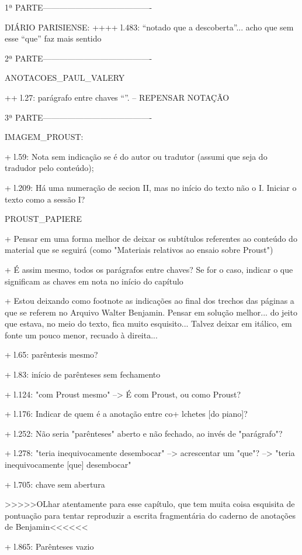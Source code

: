 1ª PARTE----------------------------------------

DIÁRIO PARISIENSE:
++++ l.483: ``notado que a descoberta''... acho que sem esse ``que'' faz mais sentido


2ª PARTE----------------------------------------


ANOTACOES_PAUL_VALERY

++ l.27: parágrafo entre chaves ``{}''. -- REPENSAR NOTAÇÃO

3ª PARTE----------------------------------------

IMAGEM_PROUST:

+ l.59: Nota sem indicação se é do autor ou tradutor (assumi que seja do tradudor pelo conteúdo);

+ l.209: Há uma numeração de secion II, mas no início do texto não o I. Iniciar o texto como a sessão I?

PROUST_PAPIERE

+ Pensar em uma forma melhor de deixar os subtítulos referentes ao conteúdo do material que se seguirá (como "Materiais relativos ao ensaio sobre Proust")

+ É assim mesmo, todos os parágrafos entre chaves? Se for o caso, indicar o que significam as chaves em nota no início do capítulo

+ Estou deixando como footnote as indicações ao final dos trechos das páginas a que se referem no Arquivo Walter Benjamin. Pensar em solução melhor... do jeito que estava, no meio do texto, fica muito esquisito... Talvez deixar em itálico, em fonte um pouco menor, recuado à direita...

+ l.65: parêntesis mesmo?

+ l.83: início de parênteses sem fechamento

+ l.124: "com Proust mesmo" --> É com Proust, ou como Proust?

+ l.176: Indicar de quem é a anotação entre co+ lchetes [do piano]?

+ l.252: Não seria "parênteses" aberto e não fechado, ao invés de "parágrafo"?

+ l.278: "teria inequivocamente desembocar" --> acrescentar um "que"? --> "teria inequivocamente [que] desembocar"

+ l.705: chave sem abertura

>>>>>OLhar atentamente para esse capítulo, que tem muita coisa esquisita de pontuação para tentar reproduzir a escrita fragmentária do caderno de anotações de Benjamin<<<<<<

+ l.865: Parênteses vazio

